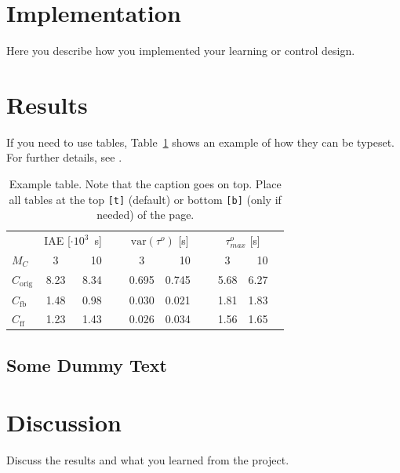 \documentclass{LTHtwocol} %
\begin{document}
\section{Implementation}
Here you describe how you implemented your learning or control design.

\section{Results}
If you need to use tables, Table~\ref{tab:extable} shows an example of how they can be typeset. For further details, see \cite{tablelatexwiki}.

\begin{table}[t]
	\centering
	\caption{Example table. Note that the caption goes on top. Place all tables at the top \texttt{[t]} (default) or bottom \texttt{[b]} (only if needed) of the page.}
	\label{tab:extable}
	\begin{tabular}{lcrrcrrcrr} %
		\toprule
        &
		\multicolumn{2}{c}{IAE [$\cdot 10^3$~s]} & &
		\multicolumn{2}{c}{$\text{var}(\tau^o)$ [s]} & &
		\multicolumn{2}{c}{$\tau^o_{max}$ [s]} \\[1mm]
		$M_C$            &  3     & 10  &~& 3     & 10    &~& 3    & 10 \\
        \midrule
		$C_{\text{orig}}$ & 8.23 & 8.34 &~& 0.695 & 0.745 &~& 5.68 & 6.27 \\
		$C_{\text{fb}}$ & 1.48 & 0.98 &~& 0.030 & 0.021 &~& 1.81 & 1.83 \\
		$C_{\text{ff}}$ & 1.23 & 1.43 &~& 0.026 & 0.034 &~& 1.56 & 1.65\\
        \bottomrule
	\end{tabular}
\end{table}

\subsection{Some Dummy Text}
\kant[4]

\section{Discussion}

Discuss the results and what you learned from the project.


\printbibliography
\end{document}
